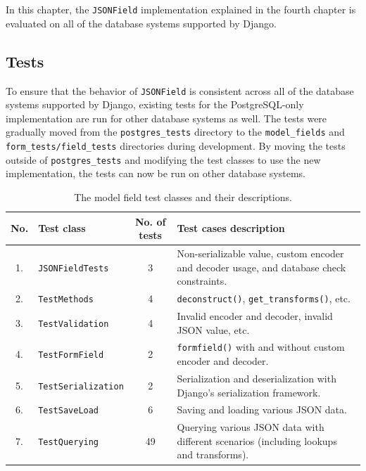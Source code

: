 \chapter{\babEnam}

In this chapter, the \verb|JSONField| implementation explained in the fourth
chapter is evaluated on all of the database systems supported by Django.

\section{Tests}

To ensure that the behavior of \verb|JSONField| is consistent across all of the
database systems supported by Django, existing tests for the PostgreSQL-only
implementation are run for other database systems as well. The tests were
gradually moved from the \verb|postgres_tests| directory to the
\verb|model_fields| and \verb|form_tests/field_tests| directories during
development. By moving the tests outside of \verb|postgres_tests| and modifying
the test classes to use the new implementation, the tests can now be run on
other database systems.

\begin{table}
	\centering
\begin{tabular}{|c|l|c|p{6.6cm}|}
\hline
No. & Test class                  & No. of tests & Test cases description \\ \hline
1.  & \texttt{JSONFieldTests}     & 3            & Non-serializable value, custom encoder and decoder usage, and database check constraints. \\ \hline
2.  & \texttt{TestMethods}        & 4            & \texttt{deconstruct()}, \texttt{get\_transforms()}, etc. \\ \hline
3.  & \texttt{TestValidation}     & 4            & Invalid encoder and decoder, invalid JSON value, etc. \\ \hline
4.  & \texttt{TestFormField}      & 2            & \texttt{formfield()} with and without custom encoder and decoder. \\ \hline
5.  & \texttt{TestSerialization}  & 2            & Serialization and deserialization with Django's serialization framework. \\ \hline
6.  & \texttt{TestSaveLoad}  	  & 6            & Saving and loading various JSON data. \\ \hline
7.  & \texttt{TestQuerying}       & 49           & Querying various JSON data with different scenarios (including lookups and transforms). \\ \hline
\end{tabular}
\caption{The  model field test classes and their descriptions.}
\label{table:testclasses}
\end{table}

